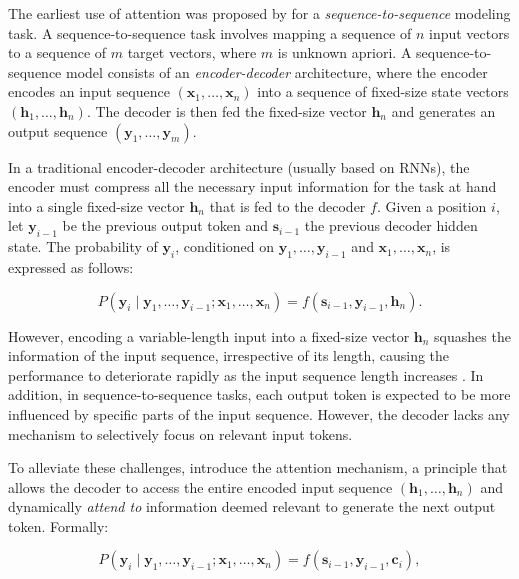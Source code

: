 The earliest use of attention was proposed by \citet{bahdanau2014neural} for a \textit{sequence-to-sequence} modeling task. A sequence-to-sequence task involves mapping a sequence of $n$ input vectors to a sequence of $m$ target vectors, where $m$ is unknown apriori. A sequence-to-sequence model \citep{sutskever2014sequence} consists of an \textit{encoder-decoder} architecture, where the encoder encodes an input sequence $(\bm{x}_1, \ldots, \bm{x}_n)$ into a sequence of fixed-size state vectors $(\bm{h}_1, \ldots, \bm{h}_n)$. The decoder is then fed the fixed-size vector $\bm{h}_n$ and generates an output sequence $(\bm{y}_1, \ldots, \bm{y}_m)$.

In a traditional encoder-decoder architecture (usually based on \acp{RNN}), the encoder must compress all the necessary input information for the task at hand into a single fixed-size vector $\bm{h}_n$ that is fed to the decoder $f$. Given a position $i$, let $\bm{y}_{i-1}$ be the previous output token and $\bm{s}_{i-1}$ the previous decoder hidden state. The probability of $\bm{y}_{i}$, conditioned on $\bm{y}_{1}, \ldots, \bm{y}_{i-1}$ and $\bm{x}_1, \ldots, \bm{x}_{n}$, is expressed as follows:

\begin{equation}
    P(\bm{y}_i \mid \bm{y}_1, \ldots, \bm{y}_{i-1}; \bm{x}_1, \ldots, \bm{x}_{n}) = f(\bm{s}_{i-1}, \bm{y}_{i-1}, \bm{h}_n). 
\end{equation}

\noindent However, encoding a variable-length input into a fixed-size vector $\bm{h}_n$ squashes the information of the input sequence, irrespective of its length, causing the performance to deteriorate rapidly as the input sequence length increases \citep{cho2014properties}. In addition, in sequence-to-sequence tasks, each output token is expected to be more influenced by specific parts of the input sequence. However, the decoder lacks any mechanism to selectively focus on relevant input tokens.

To alleviate these challenges, \citet{bahdanau2014neural} introduce the attention mechanism, a principle that allows the decoder to access the entire encoded input sequence $(\bm{h}_1, \ldots, \bm{h}_n)$ and dynamically \textit{attend to} information deemed relevant to generate the next output token. Formally:

\begin{equation}
    P(\bm{y}_i \mid \bm{y}_1, \ldots, \bm{y}_{i-1}; \bm{x}_1, \ldots, \bm{x}_{n})  = f(\bm{s}_{i-1}, \bm{y}_{i-1}, \bm{c}_i),
\end{equation}

